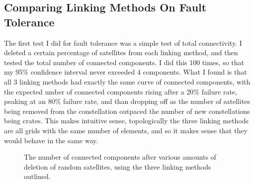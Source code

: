 \documentclass[12pt]{report}
\begin{document}
\subsection{Comparing Linking Methods On Fault Tolerance}

The first test I did for fault tolerance was a simple test of total connectivity. I deleted a certain percentage of satellites from each linking method, and then tested the total number of connected components. I did this 100 times, so that my 95\% confidence interval never exceeded 4 components. What I found is that all 3 linking methods had exactly the same curve of connected components, with the expected umber of connected components rising after a 20\% failure rate, peaking at an 80\% failure rate, and than dropping off as the number of satellites being removed from the constellation outpaced the number of new constellations being crates. This makes intuitive sense, topologically the three linking methods are all grids with the same number of elements, and so it makes sense that they would behave in the same way.

\begin{figure}
	\caption{The number of connected components after various amounts of deletion of random satellites, using the three linking methods outlined.}
	\label{fig:Connected Components After Deletions}
\end{figure}
\end{document}
